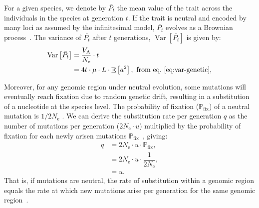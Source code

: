 \documentclass{article}
\newcommand{\Multiply}{\cdot}
\DeclareMathOperator{\E}{\mathbb{E}}
\DeclareMathOperator{\Var}{\text{Var}}
\newcommand{\Ne}{N_{\text{e}}}
\newcommand{\proba}{\mathbb{P}}
\newcommand{\pfix}{\proba_{\text{fix}}}
\newcommand{\Time}{t}
\newcommand{\Trait}{P}
\newcommand{\MeanTrait}{\bar{\Trait_{\Time}}}
\newcommand{\VarPhy}{\Var \left[\MeanTrait\right]}
\newcommand{\MutationRatePheno}{\mu}
\newcommand{\MutationRateNuc}{u}
\newcommand{\SubRate}{q}
\newcommand{\NbrLoci}{L}
\newcommand{\VarGenetic}{V_{\mathrm{A}}}
\newcommand{\GenArchi}{\NbrLoci \Multiply \E \left[ a^2 \right]}
\begin{document}
For a given species, we denote by $\MeanTrait$ the mean value of the trait across the individuals in the species at generation $\Time$.
If the trait is neutral and encoded by many loci as assumed by the infinitesimal model, $\MeanTrait$ evolves as a Brownian process~\parencite{felsenstein_phylogenies_1985, hansen_translating_1996}.
The variance of $\MeanTrait$ after $\Time$ generations, $\VarPhy$ is given \parencite{hansen_translating_1996} by:
\begin{align}
    \VarPhy & = \frac{\VarGenetic}{\Ne} \Multiply \Time \\
    & = 4 \Time \Multiply \MutationRatePheno \Multiply \GenArchi \label{eq:covar},\text{ from eq.~\ref{eq:var-genetic}},
\end{align}

Moreover, for any genomic region under neutral evolution, some mutations will eventually reach fixation due to random genetic drift, resulting in a substitution of a nucleotide at the species level.
The probability of fixation ($\pfix$) of a neutral mutation is $1/2\Ne$ \parencite{kimura_probability_1962}.
We can derive the substitution rate per generation $\SubRate$ as the number of mutations per generation ($2\Ne \Multiply \MutationRateNuc$) multiplied by the probability of fixation for each newly arisen mutations $\pfix$~\parencite{mccandlish_modeling_2014}, giving:
\begin{align}
    \SubRate & = 2 \Ne \Multiply \MutationRateNuc \Multiply \pfix, \\
    & = 2 \Ne  \Multiply \MutationRateNuc  \Multiply \dfrac{1}{2\Ne}, \\
    & = \MutationRateNuc. \label{eq:substitution-rate}
\end{align}
That is, if mutations are neutral, the rate of substitution within a genomic region equals the rate at which new mutations arise per generation for the same genomic region~\parencite{kimura_evolutionary_1968}.
\end{document}
